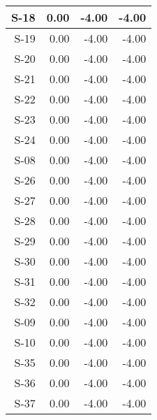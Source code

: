 \begin{tabular}{ | r | r | r | r | }
    \hline
                  S-18  &            0.00  &           -4.00  &           -4.00  \\
    \hline
                  S-19  &            0.00  &           -4.00  &           -4.00  \\
    \hline
                  S-20  &            0.00  &           -4.00  &           -4.00  \\
    \hline
                  S-21  &            0.00  &           -4.00  &           -4.00  \\
    \hline
                  S-22  &            0.00  &           -4.00  &           -4.00  \\
    \hline
                  S-23  &            0.00  &           -4.00  &           -4.00  \\
    \hline
                  S-24  &            0.00  &           -4.00  &           -4.00  \\
    \hline
                  S-08  &            0.00  &           -4.00  &           -4.00  \\
    \hline
                  S-26  &            0.00  &           -4.00  &           -4.00  \\
    \hline
                  S-27  &            0.00  &           -4.00  &           -4.00  \\
    \hline
                  S-28  &            0.00  &           -4.00  &           -4.00  \\
    \hline
                  S-29  &            0.00  &           -4.00  &           -4.00  \\
    \hline
                  S-30  &            0.00  &           -4.00  &           -4.00  \\
    \hline
                  S-31  &            0.00  &           -4.00  &           -4.00  \\
    \hline
                  S-32  &            0.00  &           -4.00  &           -4.00  \\
    \hline
                  S-09  &            0.00  &           -4.00  &           -4.00  \\
    \hline
                  S-10  &            0.00  &           -4.00  &           -4.00  \\
    \hline
                  S-35  &            0.00  &           -4.00  &           -4.00  \\
    \hline
                  S-36  &            0.00  &           -4.00  &           -4.00  \\
    \hline
                  S-37  &            0.00  &           -4.00  &           -4.00  \\

\end{tabular}

